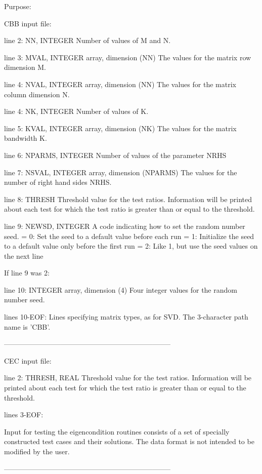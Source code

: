 \begin{DoxyParagraph}{Purpose\+: }
\begin{DoxyVerb}
 CBB input file:

 line 2:  NN, INTEGER
          Number of values of M and N.

 line 3:  MVAL, INTEGER array, dimension (NN)
          The values for the matrix row dimension M.

 line 4:  NVAL, INTEGER array, dimension (NN)
          The values for the matrix column dimension N.

 line 4:  NK, INTEGER
          Number of values of K.

 line 5:  KVAL, INTEGER array, dimension (NK)
          The values for the matrix bandwidth K.

 line 6:  NPARMS, INTEGER
          Number of values of the parameter NRHS

 line 7:  NSVAL, INTEGER array, dimension (NPARMS)
          The values for the number of right hand sides NRHS.

 line 8:  THRESH
          Threshold value for the test ratios.  Information will be
          printed about each test for which the test ratio is greater
          than or equal to the threshold.

 line 9:  NEWSD, INTEGER
          A code indicating how to set the random number seed.
          = 0:  Set the seed to a default value before each run
          = 1:  Initialize the seed to a default value only before the
                first run
          = 2:  Like 1, but use the seed values on the next line

 If line 9 was 2:

 line 10: INTEGER array, dimension (4)
          Four integer values for the random number seed.

 lines 10-EOF:  Lines specifying matrix types, as for SVD.
          The 3-character path name is 'CBB'.

-----------------------------------------------------------------------

 CEC input file:

 line  2: THRESH, REAL
          Threshold value for the test ratios.  Information will be
          printed about each test for which the test ratio is greater
          than or equal to the threshold.

 lines  3-EOF:

 Input for testing the eigencondition routines consists of a set of
 specially constructed test cases and their solutions.  The data
 format is not intended to be modified by the user.

-----------------------------------------------------------------------


\end{DoxyVerb}
\end{DoxyParagraph}
